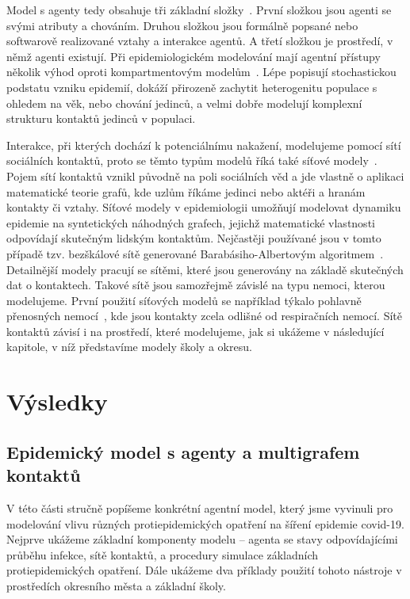 Model s agenty tedy obsahuje tři základní složky~\cite{Macal14}. První složkou jsou agenti se svými atributy a chováním. Druhou složkou jsou formálně popsané nebo softwarově realizované vztahy a interakce agentů. A třetí složkou je prostředí, v němž agenti existují.   
Při epidemiologickém modelování mají agentní přístupy několik výhod oproti kompartmentovým modelům~\cite{Zino2021}. Lépe popisují stochastickou podstatu vzniku epidemií, dokáží přirozeně zachytit heterogenitu populace s ohledem na věk, nebo chování jedinců, a velmi dobře modelují komplexní strukturu kontaktů jedinců v populaci. 

Interakce, při kterých dochází k potenciálnímu nakažení, modelujeme pomocí sítí sociálních kontaktů, proto se těmto typům modelů říká také síťové modely~\cite{Keeling2005}. Pojem sítí kontaktů vznikl původně na poli sociálních věd a jde vlastně o aplikaci matematické teorie grafů, kde uzlům říkáme jedinci nebo aktéři a hranám kontakty či vztahy. Síťové modely v epidemiologii umožňují modelovat dynamiku epidemie na syntetických náhodných grafech, jejichž matematické vlastnosti odpovídají skutečným lidským kontaktům. Nejčastěji používané jsou v tomto případě tzv. bezškálové sítě generované Barabásiho-Albertovým algoritmem~\cite{Barabasi99}. Detailnější modely pracují se sítěmi, které jsou generovány na základě skutečných dat o kontaktech. Takové sítě jsou samozřejmě závislé na typu nemoci, kterou modelujeme. První použití síťových modelů se například týkalo pohlavně přenosných nemocí~\cite{Klovdahl85}, kde jsou kontakty zcela odlišné od respiračních nemocí. Sítě kontaktů závisí i na prostředí, které modelujeme, jak si ukážeme v následující kapitole, v níž představíme modely školy a okresu.


\section*{Výsledky} 

\subsection*{Epidemický model s agenty a multigrafem kontaktů}

V této části stručně popíšeme konkrétní agentní model, který jsme vyvinuli pro modelování vlivu různých protiepidemických opatření na šíření epidemie covid-19. Nejprve ukážeme základní komponenty modelu -- agenta se stavy odpovídajícími průběhu infekce, sítě kontaktů, a procedury simulace základních protiepidemických opatření. Dále ukážeme dva příklady použití tohoto nástroje v prostředích okresního města a základní školy.  

